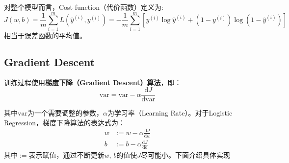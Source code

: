 对整个模型而言，Cost function（代价函数）定义为:
\begin{equation}
    J(w, b) = \frac{1}{m} \sum_{i=1}^{m} L(\hat{y}^{(i)}, y^{(i)}) = -\frac{1}{m} \sum_{i=1}^{m} \left[y^{(i)} \log \hat{y}^{(i)} + (1 - y^{(i)}) \log (1 - \hat{y}^{(i)})\right] \label{eq:cost}
\end{equation}
相当于误差函数的平均值。

\subsection{Gradient Descent}

训练过程使用\textbf{梯度下降（Gradient Descent）算法}，即：
\begin{equation}
    \mathrm{var} = \mathrm{var} - \alpha \frac{\mathrm{d}J}{\mathrm{d}\mathrm{var}} \label{eq:gradient}
\end{equation}

其中$\mathrm{var}$为一个需要调整的参数，$\alpha$为学习率（Learning Rate）。对于Logistic Regression，梯度下降算法的表达式为：
\begin{equation}
    \begin{aligned}
    w &:= w - \alpha \frac{\mathrm{d}J}{\mathrm{d}w} \\
    b &:= b - \alpha \frac{\mathrm{d}J}{\mathrm{d}b}
    \end{aligned} 
    \label{eq:gradient_logistic}
\end{equation}
其中$:=$表示赋值，通过不断更新$w$, $b$的值使$J$尽可能小。下面介绍具体实现


